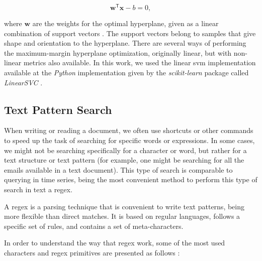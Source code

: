 \begin{equation}
\mathbf {w} ^{\mathsf {T}}\mathbf {x} - b = 0,
\end{equation}

where $\mathbf {w}$ are the weights for the optimal hyperplane, given as a linear combination of support vectors \cite{svm}. The support vectors belong to samples that give shape and orientation to the hyperplane. There are several ways of performing the maximum-margin hyperplane optimization, originally linear, but with non-linear metrics also available. In this work, we used the linear \gls{svm} implementation available at the \textit{Python} implementation given by the \textit{scikit-learn} package called \textit{LinearSVC} \cite{scikit-learn}.

\subsection{Text Pattern Search}
\label{subsec:regex_theory}

When writing or reading a document, we often use shortcuts or other commands to speed up the task of searching for specific words or expressions. In some cases, we might not be searching specifically for a character or word, but rather for a text structure or text pattern (for example, one might be searching for all the emails available in a text document). This type of search is comparable to querying in time series, being the most convenient method to perform this type of search in text a \gls{regex}.
\par
A \gls{regex} is a parsing technique that is convenient to write text patterns, being more flexible than direct matches. It is based on regular languages, follows a specific set of rules, and contains a set of meta-characters.
\par
In order to understand the way that \gls{regex} work, some of the most used characters and \gls{regex} primitives are presented as follows \cite{regex2}:

